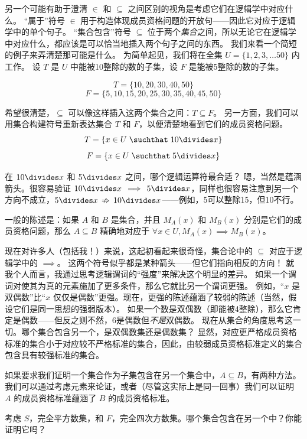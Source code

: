 \newpage

另一个可能有助于澄清 $\in$ 和 $\subseteq$ 之间区别的视角是考虑它们在逻辑学中对应什么。
“属于”符号 $\in$ 用于构造体现成员资格问题的开放句——因此它对应于逻辑学中的单个句子。
“集合包含”符号 $\subseteq$ 位于两个\emph{集合}之间，所以无论它在逻辑学中对应什么，都应该是可以恰当地插入两个句子之间的东西。
我们来看一个简短的例子来弄清楚那可能是什么。
为简单起见，我们将在全集 $U=\{ 1, 2, 3, \ldots 50 \}$ 内工作。
设 $T$ 是 $U$ 中能被10整除的数的子集，设 $F$ 是能被5整除的数的子集。

\[ T = \{10, 20, 30, 40, 50 \} \]
\[ F = \{5, 10, 15, 20, 25, 30, 35, 40, 45, 50 \} \]

希望很清楚，$\subseteq$ 可以像这样插入这两个集合之间：$T \subseteq F$。
另一方面，我们可以用集合构建符号重新表达集合 $T$ 和 $F$，以便清楚地看到它们的成员资格问题。
\[ T = \{ x \in U \; \suchthat \; 10\divides x \} \]
\[ F = \{ x \in U \; \suchthat \; 5\divides x \} \]

在 $10\divides x$ 和 $5\divides x$ 之间，哪个逻辑运算符最合适？
嗯，当然是蕴涵箭头。很容易验证 $10\divides x \, \implies \, 5\divides x$，同样也很容易注意到另一个方向不成立，$5\divides x \, \nRightarrow \, 10\divides x$——例如，5可以整除15，但10不行。

一般的陈述是：如果 $A$ 和 $B$ 是集合，并且 $M_A(x)$ 和 $M_B(x)$ 分别是它们的成员资格问题，那么 $A \subseteq B$ 精确地对应于 $\forall x \in U, M_A(x) \implies M_B(x)$。

现在对许多人（包括我！）来说，这起初看起来很奇怪，集合论中的 $\subseteq$ 对应于逻辑学中的 $\implies$。
这两个符号似乎都是某种箭头——但它们指向相反的方向！
就我个人而言，我通过思考逻辑谓词的“强度”来解决这个明显的差异。
如果一个谓词对使其为真的元素施加了更多条件，那么它就比另一个谓词更强。
例如，“$x$ 是双偶数”比“$x$ 仅仅是偶数”更强。现在，更强的陈述蕴涵了较弱的陈述（当然，假设它们是同一思想的强弱版本）。
如果一个数是双偶数（即能被4整除），那么它肯定是偶数——但反之则不然，6是偶数但\emph{不是}双偶数。
现在从集合的角度思考这一切。哪个集合包含另一个，是双偶数集还是偶数集？
显然，对应更严格成员资格标准的集合小于对应较不严格标准的集合，因此，由较弱成员资格标准定义的集合包含具有较强标准的集合。

如果要求我们证明一个集合作为子集包含在另一个集合中，$A \subseteq B$，有两种方法。
我们可以通过考虑元素来论证，或者（尽管这实际上是同一回事）我们可以证明 $A$ 的成员资格标准蕴涵了 $B$ 的成员资格标准。
\begin{exer}
考虑 $S$，完全平方数集，和 $F$，完全四次方数集。哪个集合包含在另一个中？你能证明它吗？
\end{exer}

